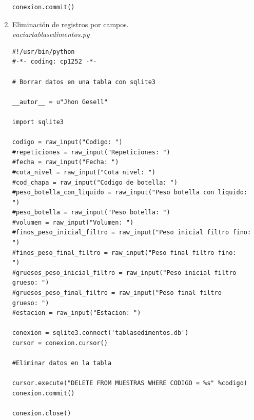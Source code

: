 \documentclass[12pt,a4paper]{report}
\begin{document}
\begin{enumerate}
\begin{lstlisting}
conexion.commit()
\end{lstlisting}

\item Eliminación de registros por campos. \\
\textit{vaciartablasedimentos.py}
\begin{lstlisting}
#!/usr/bin/python
#-*- coding: cp1252 -*-

# Borrar datos en una tabla con sqlite3

__autor__ = u"Jhon Gesell"

import sqlite3

codigo = raw_input("Codigo: ")
#repeticiones = raw_input("Repeticiones: ")
#fecha = raw_input("Fecha: ")
#cota_nivel = raw_input("Cota nivel: ")
#cod_chapa = raw_input("Codigo de botella: ")
#peso_botella_con_liquido = raw_input("Peso botella con liquido:
")
#peso_botella = raw_input("Peso botella: ")
#volumen = raw_input("Volumen: ")
#finos_peso_inicial_filtro = raw_input("Peso inicial filtro fino:
")
#finos_peso_final_filtro = raw_input("Peso final filtro fino:
")
#gruesos_peso_inicial_filtro = raw_input("Peso inicial filtro
grueso: ")
#gruesos_peso_final_filtro = raw_input("Peso final filtro
grueso: ")
#estacion = raw_input("Estacion: ")

conexion = sqlite3.connect('tablasedimentos.db')
cursor = conexion.cursor()

#Eliminar datos en la tabla

cursor.execute("DELETE FROM MUESTRAS WHERE CODIGO = %s" %codigo)
conexion.commit()

conexion.close()
\end{lstlisting}


\end{enumerate}
\end{document}
